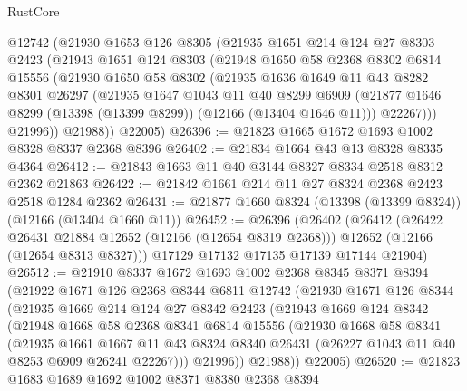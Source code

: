 \begin{lexlean}{RustCore}
\begin{coremodule}
      @12742
      (@21930
        @1653
        @126
        @8305
        (@21935
          @1651
          @214
          @124
          @27
          @8303
          @2423
          (@21943
            @1651
            @124
            @8303
            (@21948
              @1650
              @58
              @2368
              @8302
              @6814
              @15556
              (@21930
                @1650
                @58
                @8302
                (@21935
                  @1636
                  @1649
                  @11
                  @43
                  @8282
                  @8301
                  @26297
                  (@21935
                    @1647
                    @1043
                    @11
                    @40
                    @8299
                    @6909
                    (@21877 @1646 @8299 (@13398 (@13399 @8299)) (@12166 (@13404 @1646 @11)))
                    @22267)))
              @21996))
          @21988))
      @22005)
@26396 := @21823 @1665 @1672 @1693 @1002 @8328 @8337 @2368 @8396
@26402 := @21834 @1664 @43 @13 @8328 @8335 @4364
@26412 := @21843 @1663 @11 @40 @3144 @8327 @8334 @2518 @8312 @2362 @21863
@26422 := @21842 @1661 @214 @11 @27 @8324 @2368 @2423 @2518 @1284 @2362
@26431 := @21877 @1660 @8324 (@13398 (@13399 @8324)) (@12166 (@13404 @1660 @11))
@26452 := @26396
    (@26402
      (@26412
        (@26422 @26431 @21884 @12652 (@12166 (@12654 @8319 @2368)))
        @12652
        (@12166 (@12654 @8313 @8327)))
      @17129
      @17132
      @17135
      @17139
      @17144
      @21904)
@26512 := @21910
    @8337
    @1672
    @1693
    @1002
    @2368
    @8345
    @8371
    @8394
    (@21922
      @1671
      @126
      @2368
      @8344
      @6811
      @12742
      (@21930
        @1671
        @126
        @8344
        (@21935
          @1669
          @214
          @124
          @27
          @8342
          @2423
          (@21943
            @1669
            @124
            @8342
            (@21948
              @1668
              @58
              @2368
              @8341
              @6814
              @15556
              (@21930
                @1668
                @58
                @8341
                (@21935
                  @1661
                  @1667
                  @11
                  @43
                  @8324
                  @8340
                  @26431
                  (@26227 @1043 @11 @40 @8253 @6909 @26241 @22267)))
              @21996))
          @21988))
      @22005)
@26520 := @21823 @1683 @1689 @1692 @1002 @8371 @8380 @2368 @8394

\end{coremodule}
\end{lexlean}
